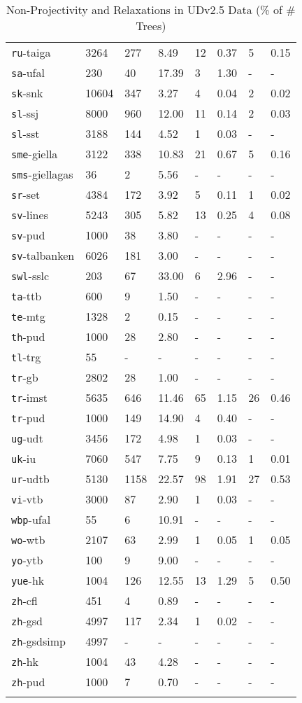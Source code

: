 \begin{longtable}{|l|l|l|l|l|l|l|l|}
\texttt{ru}-taiga & 3264 & 277 & 8.49 & 12 & 0.37 & 5 & 0.15\\
\texttt{sa}-ufal & 230 & 40 & 17.39 & 3 & 1.30 & - & -\\
\texttt{sk}-snk & 10604 & 347 & 3.27 & 4 & 0.04 & 2 & 0.02\\
\texttt{sl}-ssj & 8000 & 960 & 12.00 & 11 & 0.14 & 2 & 0.03\\
\texttt{sl}-sst & 3188 & 144 & 4.52 & 1 & 0.03 & - & -\\
\texttt{sme}-giella & 3122 & 338 & 10.83 & 21 & 0.67 & 5 & 0.16\\
\texttt{sms}-giellagas & 36 & 2 & 5.56 & - & - & - & -\\
\texttt{sr}-set & 4384 & 172 & 3.92 & 5 & 0.11 & 1 & 0.02\\
\texttt{sv}-lines & 5243 & 305 & 5.82 & 13 & 0.25 & 4 & 0.08\\
\texttt{sv}-pud & 1000 & 38 & 3.80 & - & - & - & -\\
\texttt{sv}-talbanken & 6026 & 181 & 3.00 & - & - & - & -\\
\texttt{swl}-sslc & 203 & 67 & 33.00 & 6 & 2.96 & - & -\\
\texttt{ta}-ttb & 600 & 9 & 1.50 & - & - & - & -\\
\texttt{te}-mtg & 1328 & 2 & 0.15 & - & - & - & -\\
\texttt{th}-pud & 1000 & 28 & 2.80 & - & - & - & -\\
\texttt{tl}-trg & 55 & - & - & - & - & - & -\\
\texttt{tr}-gb & 2802 & 28 & 1.00 & - & - & - & -\\
\texttt{tr}-imst & 5635 & 646 & 11.46 & 65 & 1.15 & 26 & 0.46\\
\texttt{tr}-pud & 1000 & 149 & 14.90 & 4 & 0.40 & - & -\\
\texttt{ug}-udt & 3456 & 172 & 4.98 & 1 & 0.03 & - & -\\
\texttt{uk}-iu & 7060 & 547 & 7.75 & 9 & 0.13 & 1 & 0.01\\
\texttt{ur}-udtb & 5130 & 1158 & 22.57 & 98 & 1.91 & 27 & 0.53\\
\texttt{vi}-vtb & 3000 & 87 & 2.90 & 1 & 0.03 & - & -\\
\texttt{wbp}-ufal & 55 & 6 & 10.91 & - & - & - & -\\
\texttt{wo}-wtb & 2107 & 63 & 2.99 & 1 & 0.05 & 1 & 0.05\\
\texttt{yo}-ytb & 100 & 9 & 9.00 & - & - & - & -\\
\texttt{yue}-hk & 1004 & 126 & 12.55 & 13 & 1.29 & 5 & 0.50\\
\texttt{zh}-cfl & 451 & 4 & 0.89 & - & - & - & -\\
\texttt{zh}-gsd & 4997 & 117 & 2.34 & 1 & 0.02 & - & -\\
\texttt{zh}-gsdsimp & 4997 & - & - & - & - & - & -\\
\texttt{zh}-hk & 1004 & 43 & 4.28 & - & - & - & -\\
\texttt{zh}-pud & 1000 & 7 & 0.70 & - & - & - & -\\
\hline
\caption{Non-Projectivity and Relaxations in UDv2.5 Data (\% of \# Trees)}
\end{longtable}